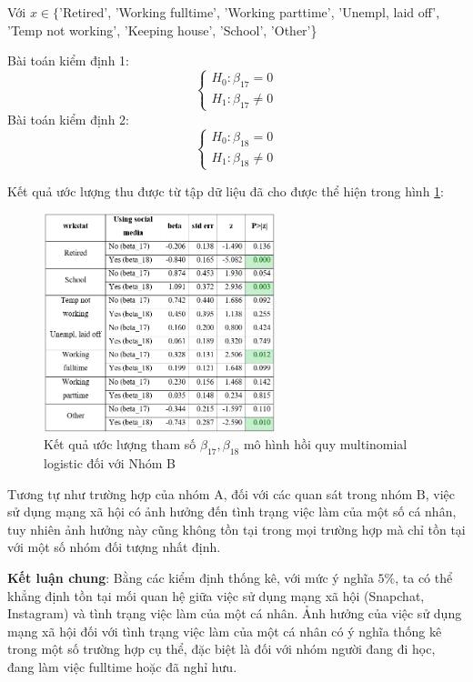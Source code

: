 Với $x \in\{$'Retired', 'Working fulltime', 'Working parttime', 'Unempl, laid off', 'Temp not working', 'Keeping house', 'School', 'Other'\}

Bài toán kiểm định 1:
$$
\left\{\begin{array}{l}
H_{0}: \beta_{17}=0 \\
H_{1}: \beta_{17} \neq 0
\end{array}\right.
$$
Bài toán kiểm định 2:
$$
\left\{\begin{array}{l}
H_{0}: \beta_{18}=0 \\
H_{1}: \beta_{18} \neq 0
\end{array}\right.
$$

Kết quả ước lượng thu được từ tập dữ liệu đã cho được thể hiện trong hình \ref{fig:beta1718}:

\begin{figure}[h!]
    \centering
    \includegraphics[width=0.6\textwidth]{figures/beta1718.png}
    \caption{Kết quả ước lượng tham số $\beta_{17}, \beta_{18}$ mô hình hồi quy multinomial logistic đối với Nhóm B}
    \label{fig:beta1718}
\end{figure}

Tương tự như trường hợp của nhóm $\mathrm{A}$, đối với các quan sát trong nhóm $\mathrm{B}$, việc sử dụng mạng xã hội có ảnh hưởng đến tình trạng việc làm của một số cá nhân, tuy nhiên ảnh hưởng này cũng không tồn tại trong mọi trường hợp mà chỉ tồn tại với một số nhóm đối tượng nhất định.


\textbf{Kết luận chung}: Bằng các kiểm định thống kê, với mức ý nghĩa $5 \%$, ta có thể khẳng định tồn tại mối quan hệ giữa việc sử dụng mạng xã hội (Snapchat, Instagram) và tình trạng việc làm của một cá nhân. Ảnh hưởng của việc sử dụng mạng xã hội đối với tình trạng việc làm của một cá nhân có ý nghĩa thống kê trong một số trường hợp cụ thể, đặc biệt là đối với nhóm người đang đi học, đang làm việc fulltime hoặc đã nghỉ hưu.
